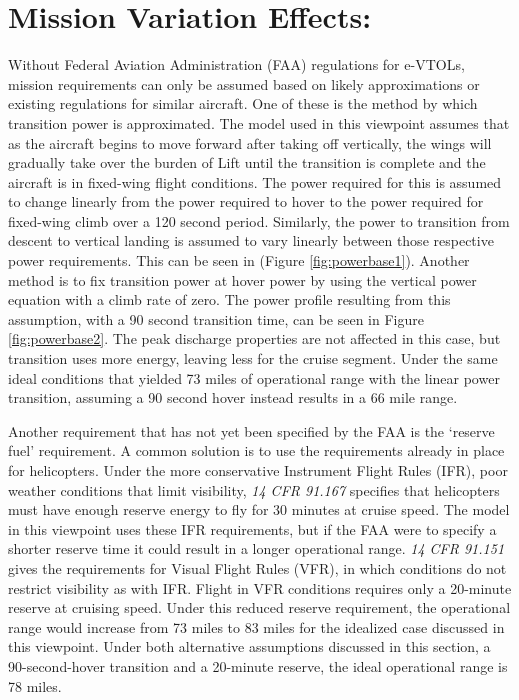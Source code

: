 \documentclass{achemso}
\begin{document}
\section*{Mission Variation Effects:}
\vspace{-0.5cm}
Without Federal Aviation Administration (FAA) regulations for e-VTOLs, mission requirements can only be assumed based on likely approximations or existing regulations for similar aircraft. One of these is the method by which transition power is approximated. The model used in this viewpoint assumes that as the aircraft begins to move forward after taking off vertically, the wings will gradually take over the burden of Lift until the transition is complete and the aircraft is in fixed-wing flight conditions. The power required for this is assumed to change linearly from the power required to hover to the power required for fixed-wing climb over a 120 second period. Similarly, the power to transition from descent to vertical landing is assumed to vary linearly between those respective power requirements. \cite{boeing2017vtolCost} This can be seen in (Figure \ref{fig:powerbase1}). Another method is to fix transition power at hover power by using the vertical power equation with a climb rate of zero. \cite{NASA2018vtolTech} The power profile resulting from this assumption, with a 90 second transition time, can be seen in Figure \ref{fig:powerbase2}. The peak discharge properties are not affected in this case, but transition uses more energy, leaving less for the cruise segment. Under the same ideal conditions that yielded 73 miles of operational range with the linear power transition, assuming a 90 second hover instead results in a 66 mile range. 

Another requirement that has not yet been specified by the FAA is the `reserve fuel' requirement. A common solution is to use the requirements already in place for helicopters. Under the more conservative Instrument Flight Rules (IFR), poor weather conditions that limit visibility, \textit{14 CFR 91.167} specifies that helicopters must have enough reserve energy to fly for 30 minutes at cruise speed. \cite{FAR14} The model in this viewpoint uses these IFR requirements, but if the FAA were to specify a shorter reserve time it could result in a longer operational range. \textit{14 CFR 91.151} gives the requirements for Visual Flight Rules (VFR), in which conditions do not restrict visibility as with IFR. Flight in VFR conditions requires only a 20-minute reserve at cruising speed. \cite{FAR14} Under this reduced reserve requirement, the operational range would increase from 73 miles to 83 miles for the idealized case discussed in this viewpoint. Under both alternative assumptions discussed in this section, a 90-second-hover transition and a 20-minute reserve, the ideal operational range is 78 miles. 
\end{document}
